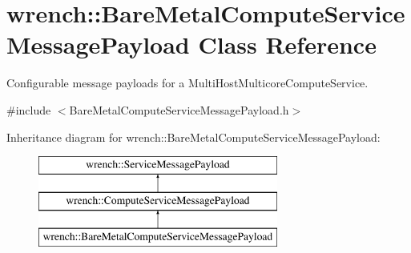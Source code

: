 \hypertarget{classwrench_1_1_bare_metal_compute_service_message_payload}{}\section{wrench\+:\+:Bare\+Metal\+Compute\+Service\+Message\+Payload Class Reference}
\label{classwrench_1_1_bare_metal_compute_service_message_payload}


Configurable message payloads for a Multi\+Host\+Multicore\+Compute\+Service.  




{\ttfamily \#include $<$Bare\+Metal\+Compute\+Service\+Message\+Payload.\+h$>$}

Inheritance diagram for wrench\+:\+:Bare\+Metal\+Compute\+Service\+Message\+Payload\+:\begin{figure}[H]
\begin{center}
\leavevmode
\includegraphics[height=3.000000cm]{classwrench_1_1_bare_metal_compute_service_message_payload}
\end{center}
\end{figure}
